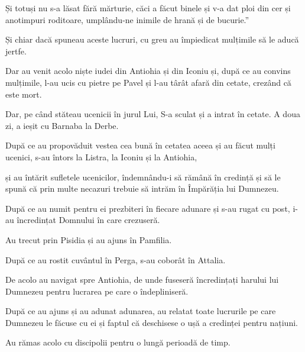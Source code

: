 {Și totuși nu s-a lăsat fără mărturie, căci a făcut binele și v-a dat ploi din cer și anotimpuri roditoare, umplându-ne inimile de hrană și de bucurie.”


\par }{\PP {}Și chiar dacă spuneau aceste lucruri, cu greu au împiedicat mulțimile să le aducă jertfe.

Dar au venit acolo niște iudei din Antiohia și din Iconiu și, după ce au convins mulțimile, l-au ucis cu pietre pe Pavel și l-au târât afară din cetate, crezând că este mort.


\par }{\PP {}Dar, pe când stăteau ucenicii în jurul Lui, S-a sculat și a intrat în cetate. A doua zi, a ieșit cu Barnaba la Derbe.


\par }{\PP {}După ce au propovăduit vestea cea bună în cetatea aceea și au făcut mulți ucenici, s-au întors la Listra, la Iconiu și la Antiohia,

și au întărit sufletele ucenicilor, îndemnându-i să rămână în credință și să le spună că prin multe necazuri trebuie să intrăm în Împărăția lui Dumnezeu.

După ce au numit pentru ei prezbiteri în fiecare adunare și s-au rugat cu post, i-au încredințat Domnului în care crezuseră.


\par }{\PP {}Au trecut prin Pisidia și au ajuns în Pamfilia.

După ce au rostit cuvântul în Perga, s-au coborât în Attalia.

De acolo au navigat spre Antiohia, de unde fuseseră încredințați harului lui Dumnezeu pentru lucrarea pe care o îndepliniseră.

După ce au ajuns și au adunat adunarea, au relatat toate lucrurile pe care Dumnezeu le făcuse cu ei și faptul că deschisese o ușă a credinței pentru națiuni.

Au rămas acolo cu discipolii pentru o lungă perioadă de timp.



\par }
